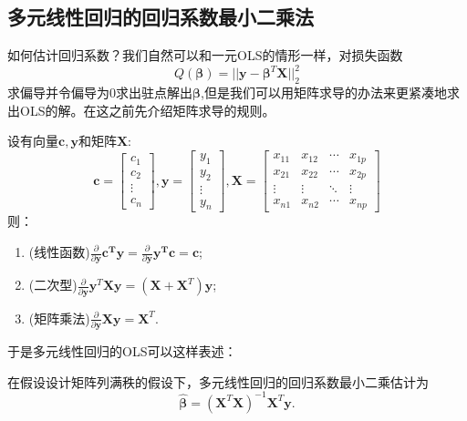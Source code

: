 \documentclass[lang=cn,10pt]{elegantbook}
\begin{document}
    \subsection{多元线性回归的回归系数最小二乘法}
    如何估计回归系数？我们自然可以和一元OLS的情形一样，对损失函数
    \[Q(\mathbf{\beta})=||\mathbf{y}-\mathbf{\beta}^T\mathbf{X}||_2^2\]
    求偏导并令偏导为0求出驻点解出\(\mathbf{\beta}\),但是我们可以用矩阵求导的办法来更紧凑地求出OLS的解。在这之前先介绍矩阵求导的规则。
    \begin{proposition}[矩阵求导]
        设有向量\(\mathbf{c},\mathbf{y}\)和矩阵\(\mathbf{X}\):
    \[\mathbf{c} =
    \begin{bmatrix}
        c_1\\
        c_2\\
        \vdots\\
        c_n
    \end{bmatrix}
    ,
        \mathbf{y} =
    \begin{bmatrix}
        y_1\\
        y_2\\
        \vdots\\
        y_n
    \end{bmatrix}
    ,
    \mathbf{X} =
    \begin{bmatrix}
        x_{11} & x_{12} & \cdots & x_{1p} \\
        x_{21} & x_{22} & \cdots & x_{2p} \\
        \vdots & \vdots & \ddots & \vdots \\
        x_{n1} & x_{n2} & \cdots & x_{np}
    \end{bmatrix}
    \]
    则：
    \begin{enumerate}
        \item (线性函数)\(\frac{\partial}{\partial \mathbf{y}}\mathbf{c^T\mathbf{y}}=\frac{\partial}{\partial \mathbf{y}}\mathbf{\mathbf{y}^T\mathbf{c}}=\mathbf{c}\);
        \item (二次型)\(\frac{\partial}{\partial \mathbf{y}}\mathbf{y}^T\mathbf{X}\mathbf{y}=(\mathbf{X}+\mathbf{X}^T)\mathbf{y}\);
        \item (矩阵乘法)\(\frac{\partial}{\partial \mathbf{y}}\mathbf{X}\mathbf{y}=\mathbf{X}^T\).
    \end{enumerate}
    \end{proposition}
    于是多元线性回归的OLS可以这样表述：
    \begin{theorem}[多元线性回归OLS]
        在假设设计矩阵列满秩的假设下，多元线性回归的回归系数最小二乘估计为
        \[\hat{\mathbf{\beta}}=(\mathbf{X}^T\mathbf{X})^{-1}\mathbf{X}^T\mathbf{y}.\]
    \end{theorem}
\end{document}
